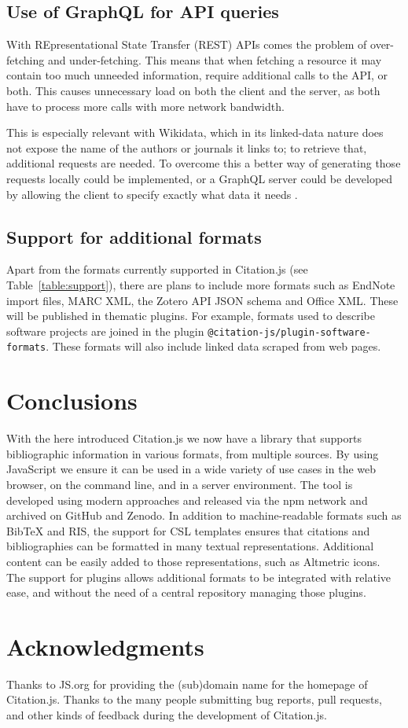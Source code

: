\documentclass[fleqn,10pt,lineno]{wlpeerj} %
\begin{document}
\subsection*{Use of GraphQL for API queries}

With REpresentational State Transfer (REST) APIs comes the problem of over-fetching and under-fetching. This means that when fetching a resource it may contain too much unneeded information, require additional calls to the API, or both. This causes unnecessary load on both the client and the server, as both have to process more calls with more network bandwidth. 

This is especially relevant with Wikidata, which in its linked-data nature does not expose the name of the authors or journals it links to; to retrieve that, additional requests are needed. To overcome this a better way of generating those requests locally could be implemented, or a GraphQL server could be developed by allowing the client to specify exactly what data it needs \citep{noauthor_graphql_2018}.

\subsection*{Support for additional formats}

Apart from the formats currently supported in Citation.js (see Table~\ref{table:support}), there are plans to include more formats such as EndNote import files, MARC \citep{avram_machine-readable_nodate} XML, the Zotero API JSON schema and Office XML. These will be published in thematic plugins. For example, formats used to describe software projects are joined in the plugin \texttt{@citation-js/plugin-software-formats}. These formats will also include linked data scraped from web pages.

\section*{Conclusions}

With the here introduced Citation.js we now have a library that supports bibliographic information in various formats, from multiple sources. By using JavaScript we ensure it can be used in a wide variety of use cases in the web browser, on the command line, and in a server environment. The tool is developed using modern approaches and released via the npm network and archived on GitHub and Zenodo. In addition to machine-readable formats such as BibTeX and RIS, the support for CSL templates ensures that citations and bibliographies can be formatted in many textual representations. Additional content can be easily added to those representations, such as Altmetric icons. The support for plugins allows additional formats to be integrated with relative ease, and without the need of a central repository managing those plugins.

\section*{Acknowledgments}

Thanks to JS.org for providing the (sub)domain name for the homepage of Citation.js.
Thanks to the many people submitting bug reports, pull requests, and other kinds of feedback during the development of Citation.js.


\end{document}
